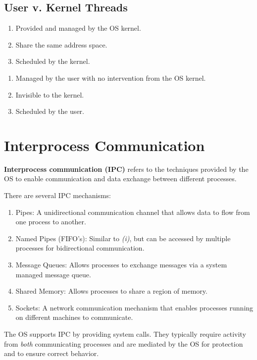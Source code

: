 \documentclass{report}
\newcommand{\definitionBegin}[1]{\begin{tcolorbox}[title={Definition: #1}]}
\newcommand{\definitionEnd}{\end{tcolorbox}}
\begin{document}
\section{User v. Kernel Threads}
\begin{tcbraster}[raster columns=2, raster equal height, raster force size=false]
  \begin{tcolorbox}[colback=teal!5!white,colframe=black!75!teal,title=Kernel]
    \begin{enumerate}[label=\textit{(\roman*)}]
    \item Provided and managed by the OS kernel.
    \item Share the same address space.
    \item Scheduled by the kernel.
    \end{enumerate}
  \end{tcolorbox}
  \begin{tcolorbox}[colback=yellow!5!white,colframe=black!75!yellow,title=User]
    \begin{enumerate}[label=\textit{(\roman*)}]
    \item Managed by the user with no intervention from the OS kernel.
    \item Invisible to the kernel.
    \item Scheduled by the user.
    \end{enumerate}
  \end{tcolorbox}
\end{tcbraster}





\chapter{Interprocess Communication}
\definitionBegin{Interprocess Communication}
\textbf{Interprocess communication (IPC)} refers to the techniques provided by the OS to enable
communication and data exchange between different processes.
\definitionEnd

There are several IPC mechanisms:

\begin{enumerate}[label=\textit{(\roman*)}]
\item Pipes: A unidirectional communication channel that allows data to flow from one process
  to another.
\item Named Pipes (FIFO's): Similar to \textit{(i)}, but can be accessed by multiple processes for
  bidirectional communication.
\item Message Queues: Allows processes to exchange messages via a system managed message queue.
\item Shared Memory: Allows processes to share a region of memory.
\item Sockets: A network communication mechanism that enables processes running on different
  machines to communicate.
\end{enumerate}
The OS supports IPC by providing system calls. They typically require activity from \textit{both}
communicating processes and are mediated by the OS for protection and to ensure correct behavior.
\end{document}
